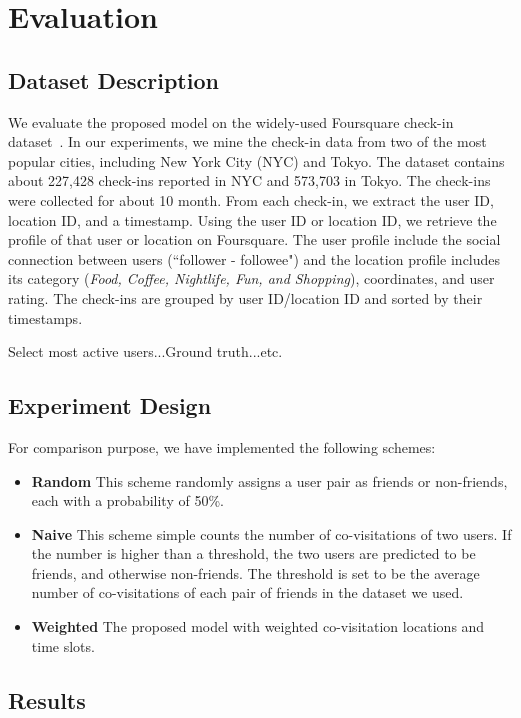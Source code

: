 \section{Evaluation} \label{sec:evaluation}

\subsection{Dataset Description}

We evaluate the proposed model on the widely-used Foursquare check-in dataset~\cite{yang2015nationtelescope}. In our experiments, we mine the check-in data from two of the most popular cities, including New York City (NYC) and Tokyo. The dataset contains about 227,428 check-ins reported in NYC and 573,703 in Tokyo. The check-ins were collected for about 10 month. From each check-in, we extract the user ID, location ID, and a timestamp. Using the user ID or location ID, we retrieve the profile of that user or location on Foursquare. The user profile include the social connection between users (``follower - followee") and the location profile includes its category (\textit{Food, Coffee, Nightlife, Fun, and Shopping}), coordinates, and user rating. The check-ins are grouped by user ID/location ID and sorted by their timestamps.


Select most active users...Ground truth...etc.

\subsection{Experiment Design}

For comparison purpose, we have implemented the following schemes:
\begin{itemize}
\item \textbf{Random} This scheme randomly assigns a user pair as friends or non-friends, each with a probability of 50\%.

\item \textbf{Naive} This scheme simple counts the number of co-visitations of two users. If the number is higher than a threshold, the two users are predicted to be friends, and otherwise non-friends. The threshold is set to be the average number of co-visitations of each pair of friends in the dataset we used.

\item \textbf{Weighted} The proposed model with weighted co-visitation locations and time slots.
\end{itemize}

\subsection{Results}

